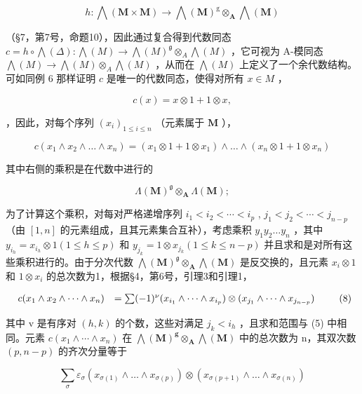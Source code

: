 \[
h: \bigwedge (\mathbf {M} \times \mathbf {M}) \rightarrow \bigwedge (\mathbf {M}) ^ {\mathrm{g}} \otimes_ {\mathbf {A}} \bigwedge (\mathbf {M})
\]

（§7，第7号，命题10），因此通过复合得到代数同态 \(c = h \circ \bigwedge(\Delta): \bigwedge(M) \to \bigwedge(M)^{\mathfrak{g}} \otimes_{A} \bigwedge(M)\) ，它可视为 A-模同态 \(\bigwedge(M) \to \bigwedge(M) \otimes_{A} \bigwedge(M)\) ，从而在 \(\bigwedge(M)\) 上定义了一个余代数结构。可如同例 6 那样证明 \(c\) 是唯一的代数同态，使得对所有 \(x \in M\) ，

\[
c (x) = x \otimes 1 + 1 \otimes x,\tag{7}
\]

，因此，对每个序列 \((x_{i})_{1\leqslant i\leqslant n}\) （元素属于 \(\mathbf{M}\) ），

\[
c \left(x _ {1} \wedge x _ {2} \wedge \dots \wedge x _ {n}\right) = \left(x _ {1} \otimes 1 + 1 \otimes x _ {1}\right) \wedge \dots \wedge \left(x _ {n} \otimes 1 + 1 \otimes x _ {n}\right)
\]

其中右侧的乘积是在代数中进行的

\[
\Lambda (\mathbf {M}) ^ {\mathfrak {g}} \otimes_ {\mathbf {A}} \Lambda (\mathbf {M});
\]

为了计算这个乘积，对每对严格递增序列 \(i_1 < i_2 < \cdots < i_p\) , \(j_1 < j_2 < \cdots < j_{n-p}\) （由 \([1, n]\) 的元素组成，且其元素集合互补），考虑乘积 \(y_1y_2\ldots y_n\) ，其中 \(y_{i_h} = x_{i_h} \otimes 1 (1 \leqslant h \leqslant p)\) 和 \(y_{j_k} = 1 \otimes x_{j_k} (1 \leqslant k \leqslant n - p)\) 并且求和是对所有这些乘积进行的。由于分次代数 \(\bigwedge (\mathbf{M})^{\mathfrak{g}} \otimes_{\mathbf{A}} \bigwedge (\mathbf{M})\) 是反交换的，且元素 \(x_i \otimes 1\) 和 \(1 \otimes x_i\) 的总次数为1，根据§4，第6号，引理3和引理1，

\[
\begin{array}{r l} c (x _ {1} \wedge x _ {2} \wedge \dots \wedge x _ {n}) & = \sum (- 1) ^ {\nu} (x _ {i _ {1}} \wedge \dots \wedge x _ {i _ {p}}) \otimes (x _ {j _ {1}} \wedge \dots \wedge x _ {j _ {n - p}}) \end{array} \tag {8}
\]

其中 v 是有序对 \((h, k)\) 的个数，这些对满足 \(j_{k} < i_{h}\) ，且求和范围与 (5) 中相同。元素 \(c(x_{1} \wedge \cdots \wedge x_{n})\) 在 \(\bigwedge(\mathbf{M})^{\mathbf{g}} \otimes_{\mathbf{A}} \bigwedge(\mathbf{M})\) 中的总次数为 n，其双次数 \((p, n - p)\) 的齐次分量等于

\[
\sum_ {\sigma} \varepsilon_ {\sigma} (x _ {\sigma (1)} \wedge \dots \wedge x _ {\sigma (p)}) \otimes (x _ {\sigma (p + 1)} \wedge \dots \wedge x _ {\sigma (n)})\tag{9}
\]

